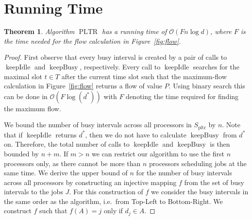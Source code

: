 \documentclass[a4paper]{article}
\DeclareMathOperator{\pltr}{pltr}
\DeclareMathOperator{\PLTR}{PLTR}
\DeclareMathOperator{\keepidle}{keepIdle}
\DeclareMathOperator{\keepbusy}{keepBusy}
\newtheorem{theorem}{Theorem}
\begin{document}
\section{Running Time}
\begin{theorem}
  Algorithm $\PLTR$ has a running time of $\mathcal{O}(F n \log d)$, where $F$ is the time needed for the flow calculation in Figure~\ref{fig:flow}.
\end{theorem}
\begin{proof}
  First observe that every busy interval is created by a pair of calls to $\keepidle$ and $\keepbusy$, respectively.
  Every call to $\keepidle$ searches for the maximal slot $t \in T$ after the current time slot such that the maximum-flow calculation in Figure~\ref{fig:flow} returns a flow of value $P$.
  Using binary search this can be done in $\mathcal{O}(F \log(d^*))$ with $F$ denoting the time required for finding the maximum flow.

  We bound the number of busy intervals across all processors in $S_{\pltr}$ by $n$.
  Note that if $\keepidle$ returns $d^*$, then we do not have to calculate $\keepbusy$ from $d^*$ on.
  Therefore, the total number of calls to $\keepidle$ and $\keepbusy$ is then bounded by $n + m$.
  If $m > n$ we can restrict our algorithm to use the first $n$ processors only, as there cannot be more than $n$ processors scheduling jobs at the same time.
  We derive the upper bound of $n$ for the number of busy intervals across all processors by constructing an injective mapping $f$ from the set of busy intervals to the jobs $J$.
  For this construction of $f$ we consider the busy intervals in the same order as the algorithm, i.e.\ from Top-Left to Bottom-Right.
  We construct $f$ such that $f(A) = j$ only if $d_j \in A$.


\end{proof}
\end{document}
